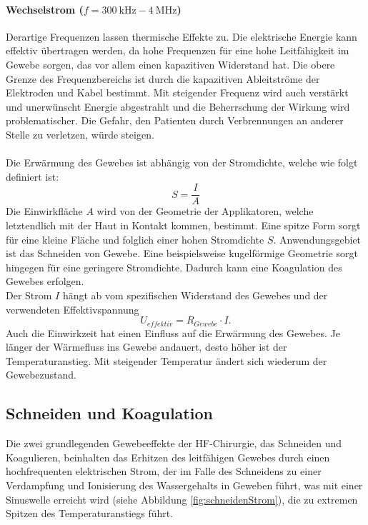 \documentclass[letterpaper,12pt]{article}
\begin{document}
			\paragraph{Wechselstrom ($f=\SI{300}{\kilo\hertz}-\SI{4}{\mega\hertz}$)}
			Derartige Frequenzen lassen thermische Effekte zu. Die elektrische Energie kann effektiv übertragen werden, da hohe Frequenzen für eine hohe Leitfähigkeit im Gewebe sorgen, das vor allem einen kapazitiven Widerstand hat. Die obere Grenze des Frequenzbereichs ist durch die kapazitiven Ableitströme der Elektroden und Kabel bestimmt. Mit steigender Frequenz wird auch verstärkt und unerwünscht Energie abgestrahlt und die Beherrschung der Wirkung wird problematischer. Die Gefahr, den Patienten durch Verbrennungen an anderer Stelle zu verletzen, würde steigen.\\\\	
			Die Erwärmung des Gewebes ist abhängig von der Stromdichte, welche wie folgt definiert ist:
			\begin{equation} \label{eq:stromdichte}
				S=\frac{I}{A}
			\end{equation}
			Die Einwirkfläche $A$ wird von der Geometrie der Applikatoren, welche letztendlich mit der Haut in Kontakt kommen, bestimmt. Eine spitze Form sorgt für eine kleine Fläche und folglich einer hohen Stromdichte $S$. Anwendungsgebiet ist das Schneiden von Gewebe. Eine beispielsweise kugelförmige Geometrie sorgt hingegen für eine geringere Stromdichte. Dadurch kann eine Koagulation des Gewebes erfolgen.\\Der Strom $I$ hängt ab vom spezifischen Widerstand des Gewebes und der verwendeten Effektivspannung
			\begin{equation} \label{eq:effektivspannung}
			U_{effektiv}=R_{Gewebe} \cdot I.
			\end{equation}
			Auch die Einwirkzeit hat einen Einfluss auf die Erwärmung des Gewebes. Je länger der Wärmefluss ins Gewebe andauert, desto höher ist der Temperaturanstieg. Mit steigender Temperatur ändert sich wiederum der Gewebezustand.
		
		\subsection{Schneiden und Koagulation}
		
			Die zwei grundlegenden Gewebeeffekte der HF-Chirurgie, das Schneiden und Koagulieren, beinhalten das Erhitzen des leitfähigen Gewebes durch einen hochfrequenten elektrischen Strom, der im Falle des Schneidens zu einer Verdampfung und Ionisierung des Wassergehalts in Geweben führt, was mit einer Sinuswelle erreicht wird (siehe Abbildung \ref{fig:schneidenStrom}), die zu extremen Spitzen des Temperaturanstiegs führt. 
			
\end{document}
